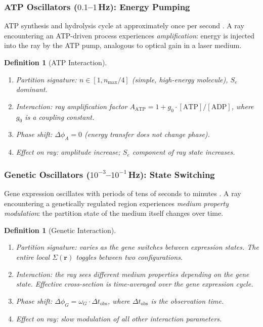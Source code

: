 \documentclass[11pt,twocolumn,a4paper]{article}
\newtheorem{definition}[theorem]{Definition}
\newcommand{\Se}{S_e}
\begin{document}
\subsubsection{ATP Oscillators ($0.1$--$1$\,Hz): Energy Pumping}

ATP synthesis and hydrolysis cycle at approximately once per second
\citep{mitchell1961}. A ray encountering an ATP-driven process
experiences \emph{amplification}: energy is injected into the ray by
the ATP pump, analogous to optical gain in a laser medium.

\begin{definition}[ATP Interaction]
\label{def:atp-interaction}
\begin{enumerate}[label=(\alph*),leftmargin=*]
\item \textit{Partition signature:} $n \in [1, n_{\max}/4]$ (simple,
  high-energy molecule), $\Se$ dominant.
\item \textit{Interaction:} ray amplification factor
  $A_{\mathrm{ATP}} = 1 + g_0 \cdot [\text{ATP}]/[\text{ADP}]$,
  where $g_0$ is a coupling constant.
\item \textit{Phase shift:} $\Delta\phi_A = 0$ (energy transfer does
  not change phase).
\item \textit{Effect on ray:} amplitude increase; $\Se$ component of
  ray state increases.
\end{enumerate}
\end{definition}

\subsubsection{Genetic Oscillators ($10^{-3}$--$10^{-1}$\,Hz):
State Switching}

Gene expression oscillates with periods of tens of seconds to minutes
\citep{reppert2002}. A ray encountering a genetically regulated region
experiences \emph{medium property modulation}: the partition state of
the medium itself changes over time.

\begin{definition}[Genetic Interaction]
\label{def:genetic-interaction}
\begin{enumerate}[label=(\alph*),leftmargin=*]
\item \textit{Partition signature:} varies as the gene switches between
  expression states. The entire local $\Sigma(\mathbf{r})$ toggles
  between two configurations.
\item \textit{Interaction:} the ray sees different medium properties
  depending on the gene state. Effective cross-section is
  time-averaged over the gene expression cycle.
\item \textit{Phase shift:} $\Delta\phi_G = \omega_G \cdot
  \Delta t_{\mathrm{obs}}$, where $\Delta t_{\mathrm{obs}}$ is the
  observation time.
\item \textit{Effect on ray:} slow modulation of all other interaction
  parameters.
\end{enumerate}
\end{definition}
\end{document}
